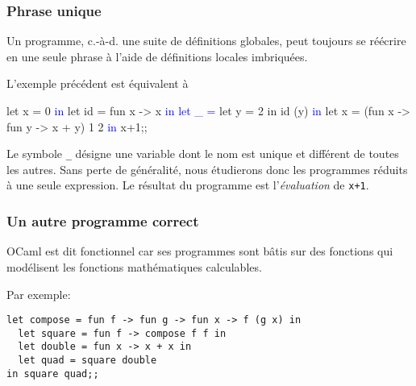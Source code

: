 %
\begin{frame}[containsverbatim]
\frametitle{Phrase unique}

Un programme, c.-à-d. une suite de définitions globales, peut toujours
se réécrire en une seule phrase à l'aide de définitions locales
imbriquées. 

\bigskip

L'exemple précédent est équivalent à
\begin{semiverbatim}
let x = 0 \textcolor{blue}{in}
  let id = fun x -> x \textcolor{blue}{in}
  \textcolor{blue}{let _ =} let y = 2 in id (y) \textcolor{blue}{in}
  let x = (fun x -> fun y -> x + y) 1 2 
\textcolor{blue}{in} x+1;;
\end{semiverbatim}
Le symbole \verb|_| désigne une variable dont le nom est unique et
différent de toutes les autres. Sans perte de généralité, nous
étudierons donc les programmes réduits à une seule expression. Le
résultat du programme est l'\emph{évaluation} de \verb|x+1|.

\end{frame}

%
\begin{frame}[containsverbatim]
\frametitle{Un autre programme correct}
\label{un_autre_programme}

OCaml est dit fonctionnel car ses programmes sont bâtis sur des
fonctions qui modélisent les fonctions mathématiques calculables.

\bigskip

Par exemple:
{\small
\begin{verbatim}
let compose = fun f -> fun g -> fun x -> f (g x) in
  let square = fun f -> compose f f in
  let double = fun x -> x + x in
  let quad = square double 
in square quad;;
\end{verbatim}
}

\end{frame}

